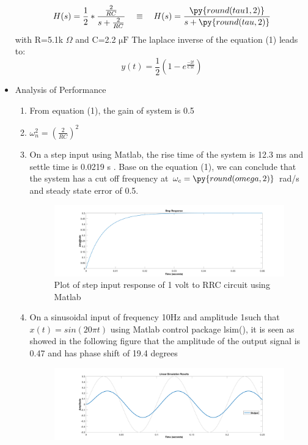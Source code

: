 \documentclass[12pt,letterpaper]{article}
\begin{document}
\begin{itemize}
    \begingroup
    \Large
    \begin{equation}
        H(s)=\frac{1}{2}  *\frac{\frac{2}{RC}}{s+ \frac{2}{RC}} \quad \equiv \quad H(s)=\frac{\py{round(tau1,2)}}{s+ \py{round(tau,2)}}
    \end{equation}
    \endgroup
    with R=5.1k \({\Omega}\) and C=2.2 \(\si{\micro\farad}\)
    The laplace inverse of the equation (1) leads to:
    \begingroup
    \Large
        \begin{equation}
            y(t)=\frac{1}{2}({1} - e^{\frac{-2t}{CR}})
        \end{equation}
    \endgroup
    \item Analysis of Performance 
    \begin{enumerate}
        \item From equation (1), the gain of system is 0.5
        \item \({\omega}_n^2={(\frac{2}{RC})}^2\)
        \item On a step input using Matlab, the rise time of the system is 12.3 ms
        and settle time is 0.0219 s . Base on the equation (1), we can conclude that
        the system has a cut off frequency at \(\omega_c = \py{round(omega,2)}\) rad/s and steady state error of 0.5.
        \begin{figure}[h]
            \includegraphics[width=17cm]{sep_theory.png}
            \caption{Plot of step input response of 1 volt to RRC circuit using Matlab}
        \end{figure}
        \item On a sinusoidal input of frequency 10Hz and amplitude 1such that \(x(t)=sin(20{\pi}t)\)
        using Matlab control package lsim(), it is seen as showed in the following figure 
        that the amplitude of the output signal is 0.47 and has phase shift of 19.4 degrees
        \begin{figure}[h]
            \includegraphics[width=17cm]{wave_theory.png}

\end{figure}
\end{enumerate}
\end{itemize}
\end{document}

